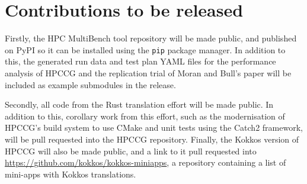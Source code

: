 \section{Contributions to be released}
\label{ssec:open-source-to-be-released}

Firstly, the HPC MultiBench tool repository will be made public, and published on PyPI so it can be installed using the \texttt{pip} package manager. In addition to this, the generated run data and test plan YAML files for the performance analysis of HPCCG and the replication trial of Moran and Bull's paper \cite{moranEmergingTechnologiesRust2023} will be included as example submodules in the release.

Secondly, all code from the Rust translation effort will be made public. In addition to this, corollary work from this effort, such as the modernisation of HPCCG's build system to use CMake and unit tests using the Catch2 framework, will be pull requested into the HPCCG repository. Finally, the Kokkos version of HPCCG will also be made public, and a link to it pull requested into \url{https://github.com/kokkos/kokkos-miniapps}, a repository containing a list of \acrshort{mini-app}s with Kokkos translations.



